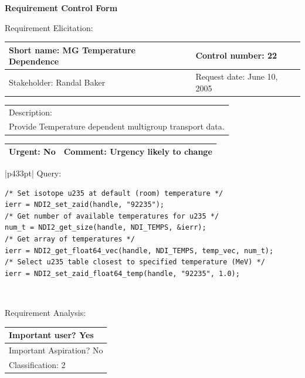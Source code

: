 \begin{center}\Large\bf
Requirement Control Form
\end{center}
\vspace{24pt}

Requirement Elicitation:

\begin{tabular}{|p{211pt}|p{211pt}|} \hline
Short name: MG Temperature Dependence & Control number: 22\\ \hline
Stakeholder: Randal Baker & Request date: June 10, 2005\\
\end{tabular}
\begin{tabular}{|p{433pt}|} \hline
Description: \\ 
Provide Temperature dependent multigroup transport data. \\
\hline
\end{tabular} 
\begin{tabular}{|p{211pt}|p{211pt}|} \hline
Urgent: No & Comment: Urgency likely to change\\ \hline
\end{tabular}

\vspace{12pt}

\begin{tabular}{|p{433pt}|} \hline
Query:
\begin{verbatim}
/* Set isotope u235 at default (room) temperature */
ierr = NDI2_set_zaid(handle, "92235");
/* Get number of available temperatures for u235 */
num_t = NDI2_get_size(handle, NDI_TEMPS, &ierr);
/* Get array of temperatures */
ierr = NDI2_get_float64_vec(handle, NDI_TEMPS, temp_vec, num_t);
/* Select u235 table closest to specified temperature (MeV) */
ierr = NDI2_set_zaid_float64_temp(handle, "92235", 1.0);
\end{verbatim}
\\ \hline

\end{tabular}

\vspace{24pt}

Requirement Analysis:

\begin{tabular}{|p{433pt}|} \hline
Important user? Yes \\ \hline
Important Aspiration? No \\ \hline
Classification: 2 \\ \hline
\end{tabular}
\vspace{24pt}


